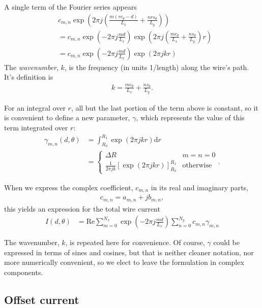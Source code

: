 \documentclass{article}
\def\d{\mathrm{d}}
\def\real{\mathrm{Re}}
\begin{document}
A single term of the Fourier series appears
\begin{align*}
&c_{m,n} \exp\left(2\pi j \left( \frac{m(r c_\theta - d)}{L_x} + \frac{n r s_\theta}{L_y} \right)\right)\\
&= c_{m,n} \exp\left(-2\pi j \frac{md}{L_x} \right) \exp\left(2\pi j \left( \frac{m c_\theta}{L_x} + \frac{n s_\theta}{L_y} \right) r\right)\\
&= c_{m,n} \exp\left(-2\pi j \frac{md}{L_x} \right) \exp\left(2\pi j k r \right)
\end{align*}
The \emph{wavenumber}, $k$, is the frequency (in units 1/length) along the wire's path.  It's definition is
\begin{align}
k = \frac{m c_\theta}{L_x} + \frac{n s_\theta}{L_y}.
\end{align}

For an integral over $r$, all but the last portion of the term above is constant, so it is convenient to define a new parameter, $\gamma$, which represents the value of this term integrated over $r$:
\begin{align}
\gamma_{m,n}(d,\theta) &= \int_{R_0}^{R_1} \exp\left(2\pi j k r \right) \d r \nonumber\\
 &= \left\{\begin{array}{c|l}
 \Delta R & m = n = 0\\
 \frac{1}{2\pi j k}\left[\exp\left(2\pi j k r \right)\right]^{R_1}_{R_0} & \mathrm{otherwise}
\end{array}
\right. .
\end{align}

When we express the complex coefficient, $c_{m,n}$ in its real and imaginary parts,
\begin{align}
c_{m,n} = a_{m,n} + j b_{m,n},
\end{align}
this yields an expression for the total wire current
\begin{align}
I(d,\theta) &= \real \sum_{m=0}^{N_x} \exp\left(-2\pi j \frac{md}{L_x} \right) \sum_{n=0}^{N_y} c_{m,n} \gamma_{m,n} 
\end{align}

The wavenumber, $k$, is repeated here for convenience.  Of course, $\gamma$ could be expressed in terms of sines and cosines, but that is neither cleaner notation, nor more numerically convenient, so we elect to leave the formulation in complex components.

\subsection{Offset current}
\end{document}
